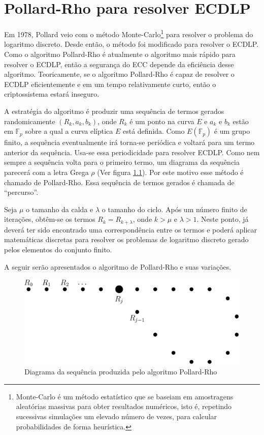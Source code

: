 \chapter{Pollard-Rho para resolver ECDLP}
Em 1978, Pollard veio com o método Monte-Carlo\footnote{Monte-Carlo é um método estatístico que se baseiam em amostragens aleatórias massivas para obter resultados numéricos, isto é, repetindo sucessivas simulações um elevado número de vezes, para calcular probabilidades de forma heurística.} para resolver o problema do logaritmo discreto. Desde então, o método foi modificado para resolver o ECDLP. Como o algoritmo Pollard-Rho é atualmente o algoritmo mais rápido para resolver o ECDLP, então a segurança do ECC depende da eficiência desse algoritmo. Teoricamente, se o algoritmo Pollard-Rho é capaz de resolver o ECDLP eficientemente e em um tempo relativamente curto, então o criptossistema estará inseguro. \cite{Mandy:2007}

A estratégia do algoritmo é produzir uma sequência de termos gerados randomicamente $(R_k, a_k, b_k)$, onde \(R_k\) é um ponto na curva \(E\) e \(a_k\)  e \(b_k\) estão em $\mathbb{F}_p$ sobre a qual a curva elíptica \(E\) está definida. Como $E(\mathbb{F}_p)$ é um grupo finito, a sequência eventualmente irá torna-se periódica e voltará para um termo anterior da sequência. Usa-se essa periodicidade para resolver ECDLP. Como nem sempre a sequência volta para o primeiro termo, um diagrama da sequência parecerá com a letra Grega \(\rho\) (Ver figura \ref{fig:rho}). Por este motivo esse método é chamado de Pollard-Rho. Essa sequência de termos gerados é chamada de ``percurso''.

Seja \(\mu\) o tamanho da calda e \(\lambda\) o tamanho do ciclo. Após um número finito de iterações, obtêm-se os termos $R_k = R_{k+\lambda}$, onde $k > \mu$ e $\lambda > 1$. Neste ponto, já deverá ter sido encontrado uma correspondência entre os termos e poderá aplicar matemáticas discretas para resolver os problemas de logaritmo discreto gerado pelos elementos do conjunto finito.

A seguir serão apresentados o algoritmo de Pollard-Rho e suas variações.

\begin{figure}[h]
\centering
\includegraphics[scale=0.4, bb=0 0 888 376]{figuras/rho.eps}
\caption{Diagrama da sequência produzida pelo algoritmo Pollard-Rho}
\label{fig:rho}
\end{figure}

